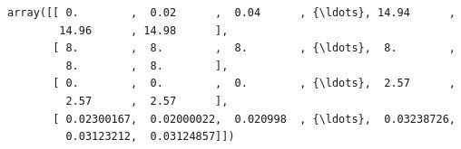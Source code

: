 \documentclass[11pt]{article}
\makeatletter
\newcommand{\boxspacing}{\kern\kvtcb@left@rule\kern\kvtcb@boxsep}
\newcommand{\prompt}[4]{
        {\ttfamily\llap{{\color{#2}[#3]:\hspace{3pt}#4}}\vspace{-\baselineskip}}
    }
\makeatother
\begin{document}
            \begin{tcolorbox}[breakable, size=fbox, boxrule=.5pt, pad at break*=1mm, opacityfill=0]
\prompt{Out}{outcolor}{2}{\boxspacing}
\begin{Verbatim}[commandchars=\\\{\}]
array([[ 0.        ,  0.02      ,  0.04      , {\ldots}, 14.94      ,
        14.96      , 14.98      ],
       [ 8.        ,  8.        ,  8.        , {\ldots},  8.        ,
         8.        ,  8.        ],
       [ 0.        ,  0.        ,  0.        , {\ldots},  2.57      ,
         2.57      ,  2.57      ],
       [ 0.02300167,  0.02000022,  0.020998  , {\ldots},  0.03238726,
         0.03123212,  0.03124857]])
\end{Verbatim}
\end{tcolorbox}
        
\end{document}
